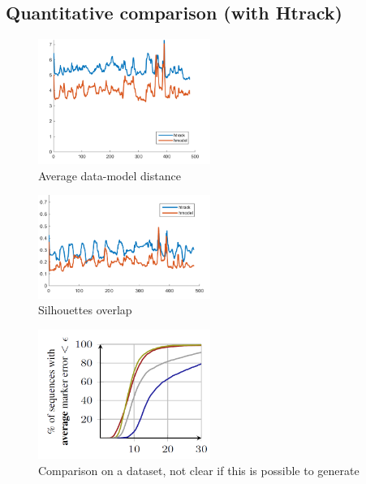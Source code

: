 \subsection{Quantitative comparison (with Htrack)}
\begin{figure}[h!] 
	\centering
	\includegraphics[width=0.5\textwidth]{fig/draft/draft_pull_error}
	\caption{Average data-model distance}
	\label{fig:modeling}
\end{figure}
\begin{figure}[h!] 
	\centering
	\includegraphics[width=0.5\textwidth]{fig/draft/draft_push_error}
	\caption{Silhouettes overlap}
	\label{fig:modeling}
\end{figure}
\begin{figure}[h!] 
	\centering
	\includegraphics[width=0.5\textwidth]{fig/draft/draft_hmodel_htrack_comparison}
	\caption{Comparison on a dataset, not clear if this is possible to generate}
	\label{fig:modeling}
\end{figure}

